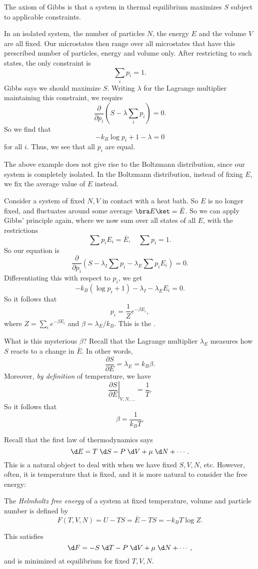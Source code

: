 \documentclass[a4paper]{article}
\begin{document}
The axiom of Gibbs is that a system in thermal equilibrium maximizes $S$ subject to applicable constraints.
\begin{eg}
  In an isolated system, the number of particles $N$, the energy $E$ and the volume $V$ are all fixed. Our microstates then range over all microstates that have this prescribed number of particles, energy and volume only. After restricting to such states, the only constraint is
  \[
    \sum_i p_i = 1.
  \]
  Gibbs says we should maximize $S$. Writing $\lambda$ for the Lagrange multiplier maintaining this constraint, we require
  \[
    \frac{\partial}{\partial p_i} \left(S - \lambda \sum_i p_i\right) = 0.
  \]
  So we find that
  \[
    -k_B \log p_i + 1 - \lambda = 0
  \]
  for all $i$. Thus, we see that all $p_i$ are equal.
\end{eg}
The above example does not give rise to the Boltzmann distribution, since our system is completely isolated. In the Boltzmann distribution, instead of fixing $E$, we fix the average value of $E$ instead.

\begin{eg}
  Consider a system of fixed $N, V$ in contact with a heat bath. So $E$ is no longer fixed, and fluctuates around some average $\bra E \ket = \bar{E}$. So we can apply Gibbs' principle again, where we now sum over all states of all $E$, with the restrictions
  \[
    \sum p_i E_i = \bar{E},\quad \sum p_i = 1.
  \]
  So our equation is
  \[
    \frac{\partial}{\partial p_i} \left(S - \lambda_I \sum p_i - \lambda_E \sum p_i E_i\right) = 0.
  \]
  Differentiating this with respect to $p_i$, we get
  \[
     -k_B (\log p_i + 1) - \lambda_I - \lambda_E E_i = 0.
  \]
  So it follows that
  \[
    p_i = \frac{1}{Z} e^{-\beta E_i},
  \]
  where $Z = \sum_i e^{-\beta E_i}$ and $\beta = \lambda_E/k_B$. This is the .

  What is this mysterious $\beta$? Recall that the Lagrange multiplier $\lambda_E$ measures how $S$ reacts to a change in $\bar{E}$. In other words,
   \[
    \frac{\partial S}{\partial E} = \lambda_E = k_B \beta.
  \]
  Moreover, \emph{by definition} of temperature, we have
  \[
    \left.\frac{\partial S}{\partial E}\right|_{V, N, \ldots} = \frac{1}{T}.
  \]
  So it follows that
  \[
    \beta = \frac{1}{k_B T}.
  \]
\end{eg}

Recall that the first law of thermodynamics says
\[
  \d E = T\;\d S - P \;\d V + \mu \;\d N + \cdots.
\]
This is a natural object to deal with when we have fixed $S, V, N$, etc. However, often, it is temperature that is fixed, and it is more natural to consider the free energy:
\begin{defi}
  The \emph{Helmholtz free energy} of a system at fixed temperature, volume and particle number is defined by
  \[
    F(T, V, N) = U - TS = \bar{E} - TS = - k_B T \log Z.
  \]
\end{defi}
This satisfies
\[
  \d F = -S \;\d T - P\;\d V + \mu\;\d N + \cdots,
\]
and is minimized at equilibrium for fixed $T, V, N$. %
\end{document}
